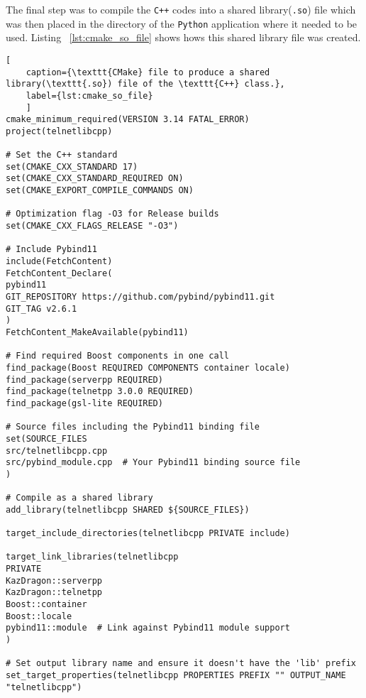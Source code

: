 The final step was to compile the \texttt{C++} codes into a shared library(\texttt{.so}) file which was then placed in the directory of the \texttt{Python} application where it needed to be used. Listing ~\ref{lst:cmake_so_file} shows hows this shared library file was created. 

\begin{lstlisting}[
	caption={\texttt{CMake} file to produce a shared library(\texttt{.so}) file of the \texttt{C++} class.},
	label={lst:cmake_so_file}
	]
cmake_minimum_required(VERSION 3.14 FATAL_ERROR)
project(telnetlibcpp)

# Set the C++ standard
set(CMAKE_CXX_STANDARD 17)
set(CMAKE_CXX_STANDARD_REQUIRED ON)
set(CMAKE_EXPORT_COMPILE_COMMANDS ON)

# Optimization flag -O3 for Release builds
set(CMAKE_CXX_FLAGS_RELEASE "-O3")

# Include Pybind11
include(FetchContent)
FetchContent_Declare(
pybind11
GIT_REPOSITORY https://github.com/pybind/pybind11.git
GIT_TAG v2.6.1
)
FetchContent_MakeAvailable(pybind11)

# Find required Boost components in one call
find_package(Boost REQUIRED COMPONENTS container locale)
find_package(serverpp REQUIRED)
find_package(telnetpp 3.0.0 REQUIRED)
find_package(gsl-lite REQUIRED)

# Source files including the Pybind11 binding file
set(SOURCE_FILES
src/telnetlibcpp.cpp
src/pybind_module.cpp  # Your Pybind11 binding source file
)

# Compile as a shared library
add_library(telnetlibcpp SHARED ${SOURCE_FILES})

target_include_directories(telnetlibcpp PRIVATE include)

target_link_libraries(telnetlibcpp
PRIVATE
KazDragon::serverpp
KazDragon::telnetpp
Boost::container
Boost::locale
pybind11::module  # Link against Pybind11 module support
)

# Set output library name and ensure it doesn't have the 'lib' prefix
set_target_properties(telnetlibcpp PROPERTIES PREFIX "" OUTPUT_NAME "telnetlibcpp")
\end{lstlisting}


